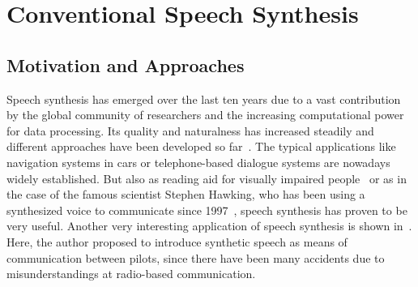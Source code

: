 

\section{Conventional Speech Synthesis}
\label{sec:speech}

\subsection{Motivation and Approaches}
\label{subsec:convenspeech}

Speech synthesis has emerged over the last ten years due to a vast contribution by the global community of researchers and the increasing computational power for data processing. Its quality and naturalness has increased steadily and different approaches have been developed so far~\cite{suendermann:challenges}. The typical applications like navigation systems in cars or telephone-based dialogue systems are nowadays widely established. But also as reading aid for visually impaired people~\cite{readspeaker:tts} or as in the case of the famous scientist Stephen Hawking, who has been using a synthesized voice to communicate since 1997~\cite{hawking:speech}, speech synthesis has proven to be very useful. Another very interesting application of speech synthesis is shown in~\cite{dhavala:communication}. Here, the author proposed to introduce synthetic speech as means of communication between pilots, since there have been many accidents due to misunderstandings at radio-based communication. %

